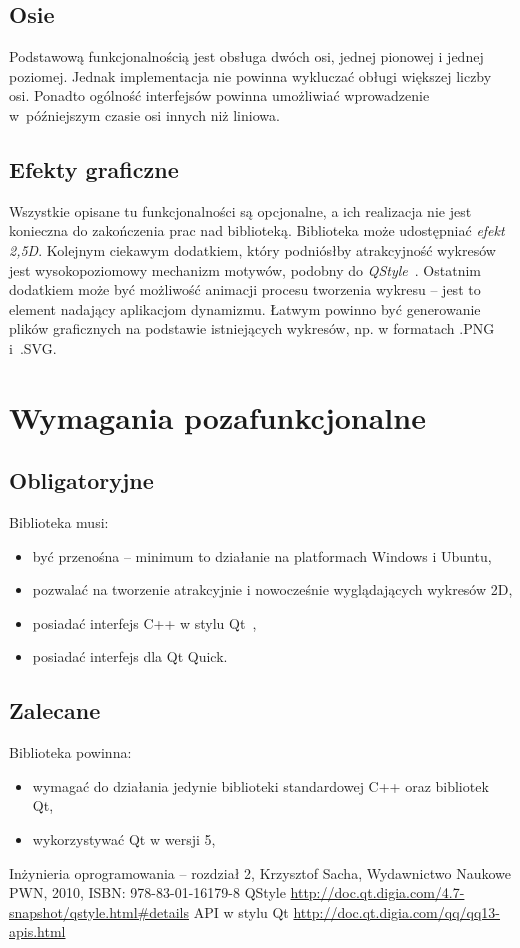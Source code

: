 \documentclass[11pt,twoside,a4paper,final]{llncs}
\begin{document}
\subsection{Osie}
Podstawową funkcjonalnością jest obsługa dwóch osi, jednej pionowej i jednej poziomej. Jednak implementacja nie powinna wykluczać obługi większej liczby osi. Ponadto ogólność interfejsów powinna umożliwiać wprowadzenie w~późniejszym czasie osi innych niż liniowa.

\subsection{Efekty graficzne}
Wszystkie opisane tu funkcjonalności są opcjonalne, a ich realizacja nie jest konieczna do zakończenia prac nad biblioteką.\newline
Biblioteka może udostępniać \textit{efekt 2,5D}. Kolejnym ciekawym dodatkiem, który podniósłby atrakcyjność wykresów jest wysokopoziomowy mechanizm motywów, podobny do \textit{QStyle}~\cite{qstyle}. Ostatnim dodatkiem może być możliwość animacji procesu tworzenia wykresu -- jest to element nadający aplikacjom dynamizmu. Łatwym powinno być generowanie plików graficznych na podstawie istniejących wykresów, np. w formatach .PNG i~.SVG.


\section{Wymagania pozafunkcjonalne}
\subsection{Obligatoryjne}
Biblioteka musi:
\begin{itemize}
\item{być przenośna -- minimum to działanie na platformach Windows i Ubuntu,}
\item{pozwalać na tworzenie atrakcyjnie i nowocześnie wyglądających wykresów 2D,}
\item{posiadać interfejs C++ w stylu Qt~\cite{qt-style-API},}
\item{posiadać interfejs dla Qt Quick.}
\end{itemize}

\subsection{Zalecane}
Biblioteka powinna:
\begin{itemize}
\item{wymagać do działania jedynie biblioteki standardowej C++ oraz bibliotek Qt,}
\item{wykorzystywać Qt w wersji 5,}

\end{itemize}


\begin{thebibliography}{}
Inżynieria oprogramowania -- rozdział 2, Krzysztof Sacha, Wydawnictwo Naukowe PWN, 2010, ISBN: 978-83-01-16179-8
QStyle \url{http://doc.qt.digia.com/4.7-snapshot/qstyle.html#details}
API w stylu Qt \url{http://doc.qt.digia.com/qq/qq13-apis.html}

\end{thebibliography}
\end{document}
